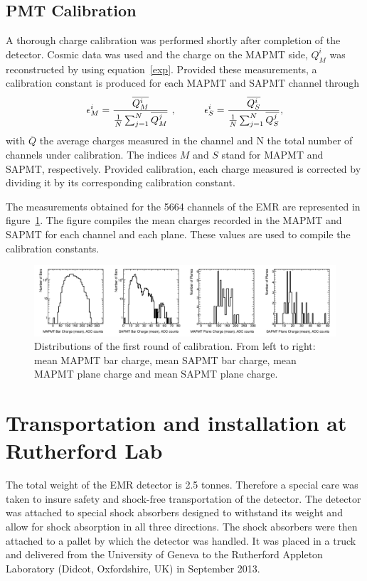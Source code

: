 \documentclass[a4paper,11pt]{article}
\begin{document}
\subsection{PMT Calibration}\label{sec:calib}
A thorough charge calibration was performed shortly after completion of the detector. Cosmic data was used and the charge on the MAPMT side, $Q_M^i$ was
reconstructed by using equation~\ref{exp}. Provided these measurements, a calibration constant is produced for each MAPMT and SAPMT channel through
\begin{equation}
\epsilon_M^i=\frac{\overline{Q_M^i}}{\frac{1}{N}\sum_{j=1}^N\overline{Q_M^j}}\ , \hspace{10mm} \epsilon_S^i=\frac{\overline{Q_S^i}}{\frac{1}{N}\sum_{j=1}^N\overline{Q_S^j}},
\end{equation}
with $\overline{Q}$ the average charges measured in the channel and N the total number of channels under calibration. The indices $M$ and $S$ stand for MAPMT
and SAPMT, respectively. Provided calibration, each charge measured is corrected by dividing it by its corresponding calibration constant.

The measurements obtained for the 5664 channels of the EMR are represented in figure~\ref{fig:calib}. The figure compiles the mean charges
recorded in the MAPMT and SAPMT for each channel and each plane. These values are used to compile the calibration constants.

\begin{figure}[htb]
\centering
\includegraphics[width=\textwidth]{calibration_charge_distrib_cut.png}
\caption{Distributions of the first round of calibration. From left to right: mean MAPMT bar charge, mean SAPMT bar charge, mean MAPMT plane charge and mean SAPMT plane charge.}
\label{fig:calib}
\end{figure}

\section{Transportation and installation at Rutherford Lab}

The total weight of the EMR detector is 2.5 tonnes. Therefore a special care was taken to insure safety and shock-free transportation of the detector.
The detector was attached to special shock absorbers designed to withstand its weight and allow for shock absorption in all three directions. The
shock absorbers were then attached to a pallet by which the detector was handled. It was placed in a truck and delivered from the University of Geneva to the
Rutherford Appleton Laboratory (Didcot, Oxfordshire, UK) in September 2013.
\end{document}
